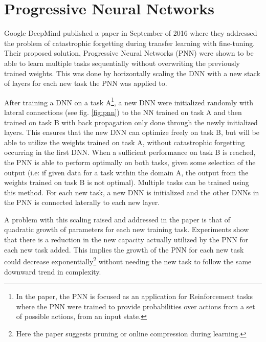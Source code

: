 \documentclass[a4paper,english]{report}
\begin{document}
\section{Progressive Neural Networks}\label{pnn}
Google DeepMind published a paper in September of 2016\cite{progressiveneuralnetworks} where they addressed the problem of catastrophic forgetting during transfer learning with fine-tuning. Their proposed solution, Progressive Neural Networks (PNN) were shown to be able to learn multiple tasks sequentially without overwriting the previously trained weights. This was done by horizontally scaling the DNN with a new stack of layers for each new task the PNN was applied to.

After training a DNN on a task A\footnote{In the paper, the PNN is focused as an application for Reinforcement tasks where the PNN were trained to provide probabilities over actions from a set of possible actions, from an input state.}, a new DNN were initialized randomly with lateral connections (see fig. \ref{fig:pnn}) to the NN trained on task A and then trained on task B with back propagation only done through the newly initialized layers. This ensures that the new DNN can optimize freely on task B, but will be able to utilize the weights trained on task A, without catastrophic forgetting occurring in the first DNN. When a sufficient performance on task B is reached, the PNN is able to perform optimally on both tasks, given some selection of the output (i.e: if given data for a task within the domain A, the output from the weights trained on task B is not optimal). Multiple tasks can be trained using this method. For each new task, a new DNN is initialized and the other DNNs in the PNN is connected laterally to each new layer. 

A problem with this scaling raised and addressed in the paper is that of quadratic growth of parameters for each new training task. Experiments show that there is a reduction in the new capacity actually utilized by the PNN for each new task added. This implies the growth of the PNN for each new task could decrease exponentially\footnote{Here the paper suggests pruning or online compression during learning.} without needing the new task to follow the same downward trend in complexity. 
\end{document}
